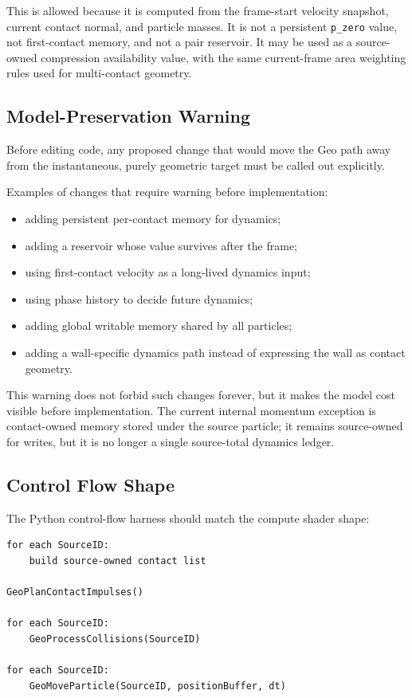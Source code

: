 This is allowed because it is computed from the frame-start velocity snapshot,
current contact normal, and particle masses.  It is not a persistent
\texttt{p\_zero} value, not first-contact memory, and not a pair reservoir.
It may be used as a source-owned compression availability value, with the same
current-frame area weighting rules used for multi-contact geometry.

\subsection{Model-Preservation Warning}

Before editing code, any proposed change that would move the Geo path away from
the instantaneous, purely geometric target must be called out explicitly.

Examples of changes that require warning before implementation:

\begin{itemize}
    \item adding persistent per-contact memory for dynamics;
    \item adding a reservoir whose value survives after the frame;
    \item using first-contact velocity as a long-lived dynamics input;
    \item using phase history to decide future dynamics;
    \item adding global writable memory shared by all particles;
    \item adding a wall-specific dynamics path instead of expressing the wall as
    contact geometry.
\end{itemize}

This warning does not forbid such changes forever, but it makes the model cost
visible before implementation.  The current internal momentum exception is
contact-owned memory stored under the source particle; it remains source-owned
for writes, but it is no longer a single source-total dynamics ledger.

\subsection{Control Flow Shape}

The Python control-flow harness should match the compute shader shape:

\begin{verbatim}
for each SourceID:
    build source-owned contact list

GeoPlanContactImpulses()

for each SourceID:
    GeoProcessCollisions(SourceID)

for each SourceID:
    GeoMoveParticle(SourceID, positionBuffer, dt)
\end{verbatim}


